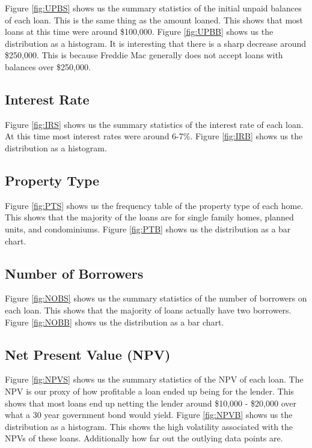 \documentclass[10pt,twocolumn,letterpaper]{article}
\begin{document}
Figure \ref{fig:UPBS} shows us the summary statistics of the initial unpaid balances of each loan. This is the same thing as the amount loaned. This shows that most loans at this time were around \$100,000. Figure \ref{fig:UPBB} shows us the distribution as a histogram. It is interesting that there is a sharp decrease around \$250,000. This is because Freddie Mac generally does not accept loans with balances over \$250,000.

\subsection{Interest Rate}

Figure \ref{fig:IRS} shows us the summary statistics of the interest rate of each loan. At this time most interest rates were around 6-7\%. Figure \ref{fig:IRB} shows us the distribution as a histogram. 

\subsection{Property Type}

Figure \ref{fig:PTS} shows us the frequency table of the property type of each home. This shows that the majority of the loans are for single family homes, planned units, and condominiums. Figure \ref{fig:PTB} shows us the distribution as a bar chart. 

\subsection{Number of Borrowers}

Figure \ref{fig:NOBS} shows us the summary statistics of the number of borrowers on each loan. This shows that the majority of loans actually have two borrowers. Figure \ref{fig:NOBB} shows us the distribution as a bar chart. 

\subsection{Net Present Value (NPV)}

Figure \ref{fig:NPVS} shows us the summary statistics of the NPV of each loan. The NPV is our proxy of how profitable a loan ended up being for the lender. This shows that most loans end up netting the lender around \$10,000 - \$20,000 over what a 30 year government bond would yield. Figure \ref{fig:NPVB} shows us the distribution as a histogram. This shows the high volatility associated with the NPVs of these loans. Additionally how far out the outlying data points are. 
\end{document}

